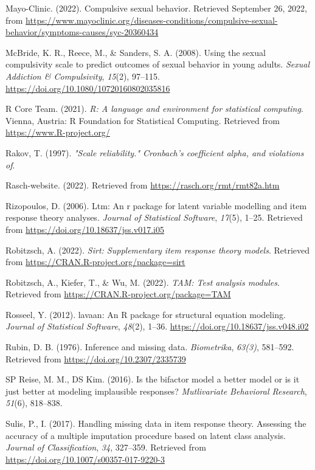 \documentclass[
  man,floatsintext]{apa6}
\newlength{\cslhangindent}
\newlength{\cslentryspacingunit} %
\newenvironment{CSLReferences}[2] %
 {%
  \setlength{\parindent}{0pt}
  \ifodd #1
  \let\oldpar\par
  \def\par{\hangindent=\cslhangindent\oldpar}
  \fi
  \setlength{\parskip}{#2\cslentryspacingunit}
 }%
 {}
\begin{document}
\begin{CSLReferences}{1}{0}
\leavevmode{}%
Mayo-Clinic. (2022). Compulsive sexual behavior. Retrieved September 26, 2022, from \url{https://www.mayoclinic.org/diseases-conditions/compulsive-sexual-behavior/symptoms-causes/syc-20360434}

\leavevmode{}%
McBride, K. R., Reece, M., \& Sanders, S. A. (2008). Using the sexual compulsivity scale to predict outcomes of sexual behavior in young adults. \emph{Sexual Addiction \& Compulsivity}, \emph{15}(2), 97--115. \url{https://doi.org/10.1080/10720160802035816}

\leavevmode{}%
R Core Team. (2021). \emph{R: A language and environment for statistical computing}. Vienna, Austria: R Foundation for Statistical Computing. Retrieved from \url{https://www.R-project.org/}

\leavevmode{}%
Rakov, T. (1997). \emph{"Scale reliability." Cronbach's coefficient alpha, and violations of}.

\leavevmode{}%
Rasch-website. (2022). Retrieved from \url{https://rasch.org/rmt/rmt82a.htm}

\leavevmode{}%
Rizopoulos, D. (2006). Ltm: An r package for latent variable modelling and item response theory analyses. \emph{Journal of Statistical Software}, \emph{17}(5), 1--25. Retrieved from \url{https://doi.org/10.18637/jss.v017.i05}

\leavevmode{}%
Robitzsch, A. (2022). \emph{Sirt: Supplementary item response theory models}. Retrieved from \url{https://CRAN.R-project.org/package=sirt}

\leavevmode{}%
Robitzsch, A., Kiefer, T., \& Wu, M. (2022). \emph{TAM: Test analysis modules}. Retrieved from \url{https://CRAN.R-project.org/package=TAM}

\leavevmode{}%
Rosseel, Y. (2012). {lavaan}: An {R} package for structural equation modeling. \emph{Journal of Statistical Software}, \emph{48}(2), 1--36. \url{https://doi.org/10.18637/jss.v048.i02}

\leavevmode{}%
Rubin, D. B. (1976). Inference and missing data. \emph{Biometrika}, \emph{63(3)}, 581--592. Retrieved from \url{https://doi.org/10.2307/2335739}

\leavevmode{}%
SP Reise, M. M., DS Kim. (2016). Is the bifactor model a better model or is it just better at modeling implausible responses? \emph{Mutlivariate Behavioral Research}, \emph{51}(6), 818--838.

\leavevmode{}%
Sulis, P., I. (2017). Handling missing data in item response theory. Assessing the accuracy of a multiple imputation procedure based on latent class analysis. \emph{Journal of Classification}, \emph{34}, 327--359. Retrieved from \url{https://doi.org/10.1007/s00357-017-9220-3}

\end{CSLReferences}
\end{document}
